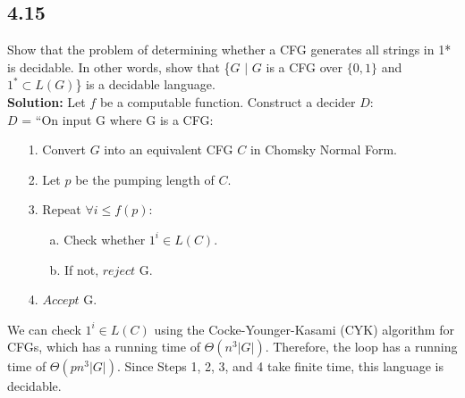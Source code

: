 \subsection*{4.15} Show that the problem of determining whether a CFG generates all strings in 1* is decidable. In other words, show that \{\textlangle{}$G$\textrangle{} $|$ $G$ is a CFG over $\{0, 1\}$ and $1^* \subset L(G)$\} is a decidable language. 
\\
\textbf{Solution:} Let $f$ be a computable function. Construct a decider $D$:
\\
$D$ = ``On input \textlangle{}G\textrangle{} where G is a CFG:
\begin{enumerate}
\itemsep0em
\item[1.]Convert $G$ into an equivalent CFG $C$ in Chomsky Normal Form.
\item[2.]Let $p$ be the pumping length of $C$.
\item[3.]Repeat $\forall i \le f(p)$:
\begin{enumerate}
\item[a.]Check whether $1^i \in L(C)$.
\item[b.]If not, $reject$ \textlangle{}G\textrangle{}.
\end{enumerate}
\item[4.]$Accept$ \textlangle{}G\textrangle{}.
\end{enumerate}
We can check $1^i \in L(C)$ using the Cocke-Younger-Kasami (CYK) algorithm for CFGs, which has a running time of $\Theta(n^3 |G|)$. Therefore, the loop has a running time of $\Theta(pn^3 |G|)$. Since Steps 1, 2, 3, and 4 take finite time, this language is decidable.